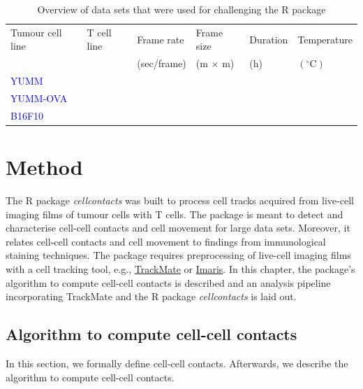 \documentclass{report}
\newcommand{\tu}{\textmu}
\begin{document}
\begin{table}[h!]
\centering
\caption[Data sets to challenge the work flow]{Overview of data sets that were used for challenging the R package} \label{Datasets_challenging}

\begin{tabular}{ P{2.5cm} P{2.5cm}  P{2cm} P{2cm} P{2cm} P{2cm}} 
Tumour cell line 	& T cell line	& Frame rate & Frame size &  Duration & Temperature\\
					& 				& (sec/frame)&(\tu m $\times$ \tu m) & (h) & $(^\circ \text{C})$\\ \midrule
\textcolor{blue}{YUMM} &  				&  &   &  &  \\[10pt]
\textcolor{blue}{YUMM-OVA} &  				&  &   &  &  \\[10pt]
\textcolor{blue}{B16F10} &  				&  &   &  &  \\[10pt]
\end{tabular}

\end{table}

\chapter{Method}

The R package \textit{cellcontacts} was built to process cell tracks acquired from live-cell imaging films of tumour cells with T cells. The package is meant to detect and characterise cell-cell contacts and cell movement for large data sets. Moreover, it relates cell-cell contacts and cell movement to findings from immunological staining techniques. The package requires preprocessing of live-cell imaging films with a cell tracking tool, e.g., \href{https://imagej.net/plugins/trackmate/}{TrackMate} or \href{https://imaris.oxinst.com/products/imaris-for-tracking}{Imaris}. 
In this chapter, the package's algorithm to compute cell-cell contacts is described and an analysis pipeline incorporating TrackMate and the R package \textit{cellcontacts} is laid out.

\section{Algorithm to compute cell-cell contacts}

In this section, we formally define cell-cell contacts. Afterwards, we describe the algorithm to compute cell-cell contacts.
\end{document}
